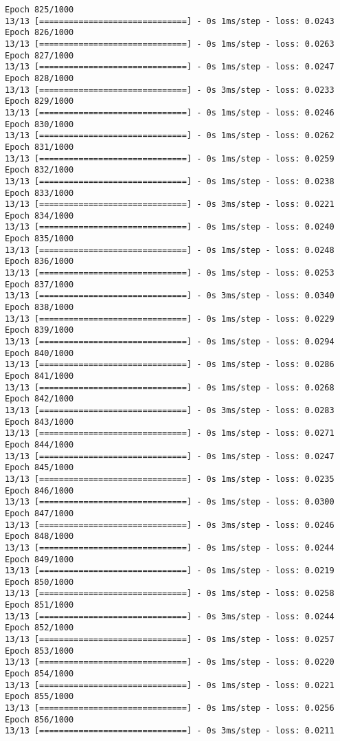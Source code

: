 \documentclass[11pt]{article}
\begin{document}
\begin{Verbatim}[commandchars=\\\{\}]
Epoch 825/1000
13/13 [==============================] - 0s 1ms/step - loss: 0.0243
Epoch 826/1000
13/13 [==============================] - 0s 1ms/step - loss: 0.0263
Epoch 827/1000
13/13 [==============================] - 0s 1ms/step - loss: 0.0247
Epoch 828/1000
13/13 [==============================] - 0s 3ms/step - loss: 0.0233
Epoch 829/1000
13/13 [==============================] - 0s 1ms/step - loss: 0.0246
Epoch 830/1000
13/13 [==============================] - 0s 1ms/step - loss: 0.0262
Epoch 831/1000
13/13 [==============================] - 0s 1ms/step - loss: 0.0259
Epoch 832/1000
13/13 [==============================] - 0s 1ms/step - loss: 0.0238
Epoch 833/1000
13/13 [==============================] - 0s 3ms/step - loss: 0.0221
Epoch 834/1000
13/13 [==============================] - 0s 1ms/step - loss: 0.0240
Epoch 835/1000
13/13 [==============================] - 0s 1ms/step - loss: 0.0248
Epoch 836/1000
13/13 [==============================] - 0s 1ms/step - loss: 0.0253
Epoch 837/1000
13/13 [==============================] - 0s 3ms/step - loss: 0.0340
Epoch 838/1000
13/13 [==============================] - 0s 1ms/step - loss: 0.0229
Epoch 839/1000
13/13 [==============================] - 0s 1ms/step - loss: 0.0294
Epoch 840/1000
13/13 [==============================] - 0s 1ms/step - loss: 0.0286
Epoch 841/1000
13/13 [==============================] - 0s 1ms/step - loss: 0.0268
Epoch 842/1000
13/13 [==============================] - 0s 3ms/step - loss: 0.0283
Epoch 843/1000
13/13 [==============================] - 0s 1ms/step - loss: 0.0271
Epoch 844/1000
13/13 [==============================] - 0s 1ms/step - loss: 0.0247
Epoch 845/1000
13/13 [==============================] - 0s 1ms/step - loss: 0.0235
Epoch 846/1000
13/13 [==============================] - 0s 1ms/step - loss: 0.0300
Epoch 847/1000
13/13 [==============================] - 0s 3ms/step - loss: 0.0246
Epoch 848/1000
13/13 [==============================] - 0s 1ms/step - loss: 0.0244
Epoch 849/1000
13/13 [==============================] - 0s 1ms/step - loss: 0.0219
Epoch 850/1000
13/13 [==============================] - 0s 1ms/step - loss: 0.0258
Epoch 851/1000
13/13 [==============================] - 0s 3ms/step - loss: 0.0244
Epoch 852/1000
13/13 [==============================] - 0s 1ms/step - loss: 0.0257
Epoch 853/1000
13/13 [==============================] - 0s 1ms/step - loss: 0.0220
Epoch 854/1000
13/13 [==============================] - 0s 1ms/step - loss: 0.0221
Epoch 855/1000
13/13 [==============================] - 0s 1ms/step - loss: 0.0256
Epoch 856/1000
13/13 [==============================] - 0s 3ms/step - loss: 0.0211

\end{Verbatim}
\end{document}
